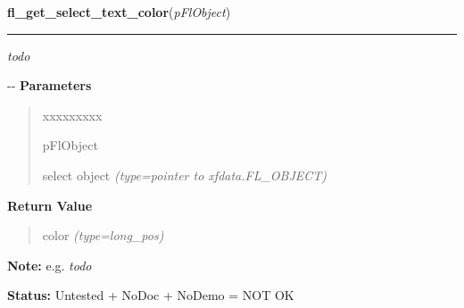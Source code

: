 \hspace{.8\funcindent}\begin{boxedminipage}{\funcwidth}

    \raggedright \textbf{fl\_get\_select\_text\_color}(\textit{pFlObject})

    \vspace{-1.5ex}

    \rule{\textwidth}{0.5\fboxrule}
\setlength{\parskip}{2ex}

\emph{todo}

-{}-
\setlength{\parskip}{1ex}
      \textbf{Parameters}
      \vspace{-1ex}

      \begin{quote}
        \begin{Ventry}{xxxxxxxxx}

          \item[pFlObject]


select object
            {\it (type=pointer to xfdata.FL\_OBJECT)}

        \end{Ventry}

      \end{quote}

      \textbf{Return Value}
    \vspace{-1ex}

      \begin{quote}

color
      {\it (type=long\_pos)}

      \end{quote}

\textbf{Note:} 
e.g. \emph{todo}


\textbf{Status:} 
Untested + NoDoc + NoDemo = NOT OK


    \end{boxedminipage}

    \label{xformslib:flselect:fl_set_select_text_color}

    \vspace{0.5ex}

